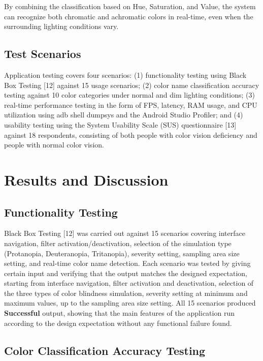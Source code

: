 By combining the classification based on Hue, Saturation, and Value, the system can recognize both chromatic and achromatic colors in real-time, even when the surrounding lighting conditions vary.

\subsection{Test Scenarios}

Application testing covers four scenarios: (1) functionality testing using Black Box Testing [12] against 15 usage scenarios; (2) color name classification accuracy testing against 10 color categories under normal and dim lighting conditions; (3) real-time performance testing in the form of FPS, latency, RAM usage, and CPU utilization using adb shell dumpsys and the Android Studio Profiler; and (4) usability testing using the System Usability Scale (SUS) questionnaire [13] against 18 respondents, consisting of both people with color vision deficiency and people with normal color vision.

\section{Results and Discussion}

\subsection{Functionality Testing}

Black Box Testing [12] was carried out against 15 scenarios covering interface navigation, filter activation/deactivation, selection of the simulation type (Protanopia, Deuteranopia, Tritanopia), severity setting, sampling area size setting, and real-time color name detection. Each scenario was tested by giving certain input and verifying that the output matches the designed expectation, starting from interface navigation, filter activation and deactivation, selection of the three types of color blindness simulation, severity setting at minimum and maximum values, up to the sampling area size setting. All 15 scenarios produced \textbf{Successful} output, showing that the main features of the application run according to the design expectation without any functional failure found.

\subsection{Color Classification Accuracy Testing}


